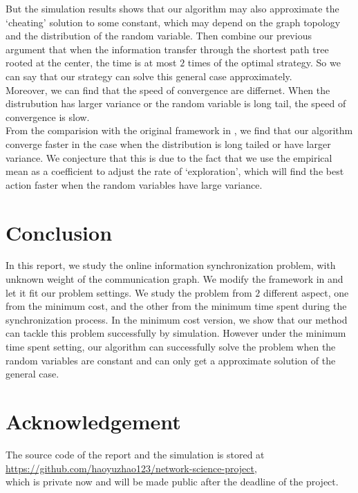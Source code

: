 \documentclass{article}
\theoremstyle{plain}
\theoremstyle{definition}
\theoremstyle{remark}
\begin{document}
    But the simulation results shows that our algorithm may also approximate the `cheating' solution to some constant, which may depend on the graph topology and the distribution of the random variable. Then combine our previous argument that when the information transfer through the shortest path tree rooted at the center, the time is at most $2$ times of the optimal strategy. So we can say that our strategy can solve this general case approximately.\\

    Moreover, we can find that the speed of convergence are differnet. When the distrubution has larger variance or the random variable is long tail, the speed of convergence is slow.\\

    From the comparision with the original framework in \citet{pmlr-v28-chen13a}, we find that our algorithm converge faster in the case when the distribution is long tailed or have larger variance. We conjecture that this is due to the fact that we use the empirical mean as a coefficient to adjust the rate of `exploration', which will find the best action faster when the random variables have large variance.

    \section{Conclusion}
    In this report, we study the online information synchronization problem, with unknown weight of the communication graph. We modify the framework in \citet{pmlr-v28-chen13a} and let it fit our problem settings. We study the problem from $2$ different aspect, one from the minimum cost, and the other from the minimum time spent during the synchronization process. In the minimum cost version, we show that our method can tackle this problem successfully by simulation. However under the minimum time spent setting, our algorithm can successfully solve the problem when the random variables are constant and can only get a approximate solution of the general case.

    \section*{Acknowledgement}
    The source code of the report and the simulation is stored at\\

    \url{https://github.com/haoyuzhao123/network-science-project}, \\

    which is private now and will be made public after the deadline of the project.

    \newpage
    
    

    
    
\end{document}
